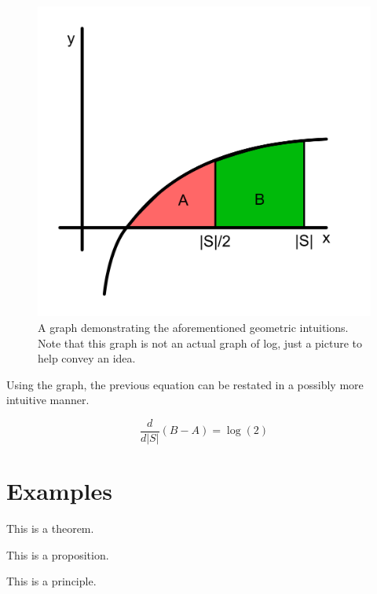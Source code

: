 \documentclass{article}
\begin{document}
\begin{figure}[h]
    \center
    \includegraphics[scale=0.4]{img/LogArea.png}
    \caption{A graph demonstrating the aforementioned geometric intuitions. Note that this graph is not an actual graph of log, just a picture to help convey an idea.}
    \label{fig:LogArea}
\end{figure}

Using the graph, the previous equation can be restated in a possibly more intuitive manner.

\begin{equation}
	\frac{d}{d|S|}(B-A)=\log(2)
\end{equation}


\section{Examples}

\begin{theorem}
    This is a theorem.
\end{theorem}

\begin{proposition}
    This is a proposition.
\end{proposition}

\begin{principle}
    This is a principle.
\end{principle}
\end{document}
